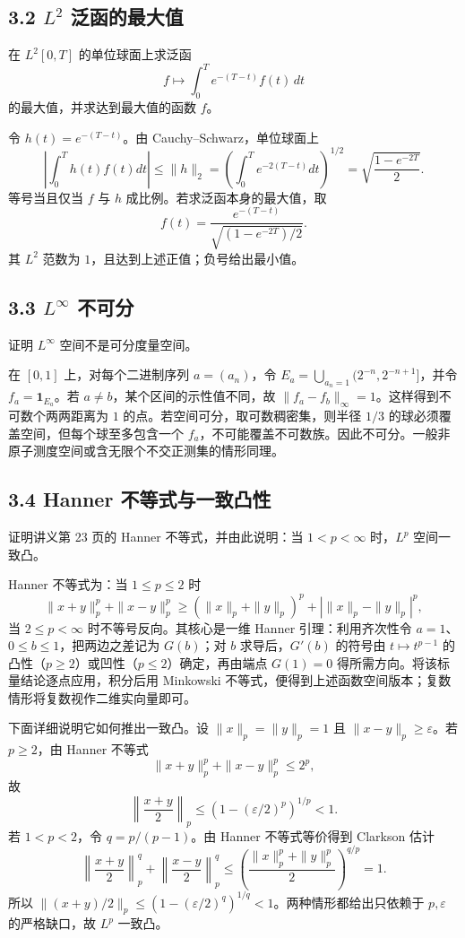 \subsection*{3.2 $L^2$ 泛函的最大值}
\begin{problem}
在 $L^2[0,T]$ 的单位球面上求泛函
\[
f\longmapsto\int_0^T e^{-(T-t)}f(t)\,dt
\]
的最大值，并求达到最大值的函数 $f$。
\end{problem}
令 $h(t)=e^{-(T-t)}$。由 Cauchy--Schwarz，单位球面上
\[
\left|\int_0^Th(t)f(t)dt\right|\le\|h\|_2
=\left(\int_0^Te^{-2(T-t)}dt\right)^{1/2}
=\sqrt{\frac{1-e^{-2T}}2}.
\]
等号当且仅当 $f$ 与 $h$ 成比例。若求泛函本身的最大值，取
\[
f(t)=\frac{e^{-(T-t)}}{\sqrt{(1-e^{-2T})/2}}.
\]
其 $L^2$ 范数为 $1$，且达到上述正值；负号给出最小值。

\subsection*{3.3 $L^\infty$ 不可分}
\begin{problem}
证明 $L^\infty$ 空间不是可分度量空间。
\end{problem}
在 $[0,1]$ 上，对每个二进制序列 $a=(a_n)$，令
$E_a=\bigcup_{a_n=1}(2^{-n},2^{-n+1}]$，并令 $f_a=\mathbf1_{E_a}$。若 $a\ne b$，某个区间的示性值不同，故
$\|f_a-f_b\|_\infty=1$。这样得到不可数个两两距离为 $1$ 的点。若空间可分，取可数稠密集，则半径 $1/3$ 的球必须覆盖空间，但每个球至多包含一个 $f_a$，不可能覆盖不可数族。因此不可分。一般非原子测度空间或含无限个不交正测集的情形同理。

\subsection*{3.4 Hanner 不等式与一致凸性}
\begin{problem}
证明讲义第 23 页的 Hanner 不等式，并由此说明：当 $1<p<\infty$ 时，$L^p$ 空间一致凸。
\end{problem}
Hanner 不等式为：当 $1\le p\le2$ 时
\[
\|x+y\|_p^p+\|x-y\|_p^p
\ge(\|x\|_p+\|y\|_p)^p+|\|x\|_p-\|y\|_p|^p,
\]
当 $2\le p<\infty$ 时不等号反向。其核心是一维 Hanner 引理：利用齐次性令 $a=1$、$0\le b\le1$，把两边之差记为 $G(b)$；对 $b$ 求导后，$G'(b)$ 的符号由 $t\mapsto t^{p-1}$ 的凸性（$p\ge2$）或凹性（$p\le2$）确定，再由端点 $G(1)=0$ 得所需方向。将该标量结论逐点应用，积分后用 Minkowski 不等式，便得到上述函数空间版本；复数情形将复数视作二维实向量即可。

下面详细说明它如何推出一致凸。设 $\|x\|_p=\|y\|_p=1$ 且 $\|x-y\|_p\ge\varepsilon$。若 $p\ge2$，由 Hanner 不等式
\[
\|x+y\|_p^p+\|x-y\|_p^p\le2^p,
\]
故
\[
\left\|\frac{x+y}{2}\right\|_p
\le\left(1-(\varepsilon/2)^p\right)^{1/p}<1.
\]
若 $1<p<2$，令 $q=p/(p-1)$。由 Hanner 不等式等价得到 Clarkson 估计
\[
\left\|\frac{x+y}{2}\right\|_p^q+
\left\|\frac{x-y}{2}\right\|_p^q
\le\left(\frac{\|x\|_p^p+\|y\|_p^p}{2}\right)^{q/p}=1.
\]
所以 $\|(x+y)/2\|_p\le(1-(\varepsilon/2)^q)^{1/q}<1$。两种情形都给出只依赖于 $p,\varepsilon$ 的严格缺口，故 $L^p$ 一致凸。

